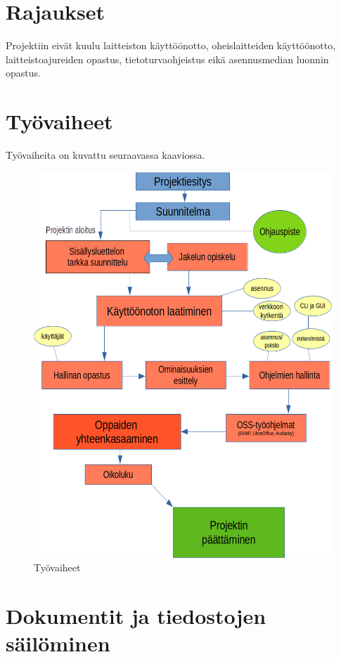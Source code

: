 \documentclass[a4paper, 12pt, finnish]{article}
\begin{document}
\section{Rajaukset}
Projektiin eivät kuulu laitteiston käyttöönotto, oheislaitteiden käyttöönotto, laitteistoajureiden opastus, tietoturvaohjeistus eikä asennusmedian luonnin opastus.
\section{Työvaiheet}
Työvaiheita on kuvattu seuraavassa kaaviossa.
\begin{figure}[!htpb]
    \centering
    \includegraphics[width=\textwidth]{kaaviokuva}
    \caption{Työvaiheet}
    \label{}
\end{figure}

\section{Dokumentit ja tiedostojen säilöminen}
\end{document}
